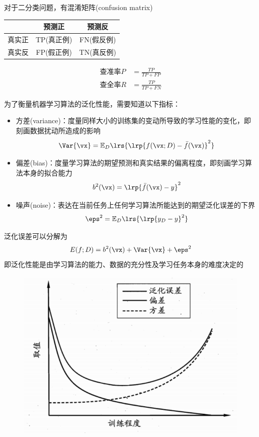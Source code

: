对于二分类问题，有混淆矩阵(confusion matrix)
\begin{center}
\begin{tabular}{|c|c|c|}\hline
& 预测正 & 预测反\\\hline
真实正 & TP(真正例) & FN(假反例)\\\hline
真实反 & FP(假正例) & TN(真反例)\\\hline
\end{tabular}
\end{center}
\[\begin{aligned}
\text{查准率}P&=\frac{TP}{TP+FP}\\
\text{查全率}R&=\frac{TP}{TP+FN}
\end{aligned}\]

为了衡量机器学习算法的泛化性能，需要知道以下指标：
\begin{itemize}
	\item 方差(variance)：度量同样大小的训练集的变动所导致的学习性能的变化，即刻画数据扰动所造成的影响
	\[\Var{\vx}=\mathbb{E}_D\lrs{\lrp{f(\vx;D)-\bar{f}(\vx)}^2}\]
	\item 偏差(bias)：度量学习算法的期望预测和真实结果的偏离程度，即刻画学习算法本身的拟合能力
	\[b^2(\vx)=\lrp{\bar{f}(\vx)-y}^2\]
	\item 噪声(noise)：表达在当前任务上任何学习算法所能达到的期望泛化误差的下界
	\[\eps^2=\mathbb{E}_D\lrs{\lrp{y_D-y}^2}\]
\end{itemize}

泛化误差可以分解为
\[E(f;D)=b^2(\vx)+\Var{\vx}+\eps^2\]
即泛化性能是由学习算法的能力、数据的充分性及学习任务本身的难度决定的
\begin{figure}[H]
\centering
\includegraphics[width=0.4\linewidth]{fig/bias-var.png}
\end{figure}